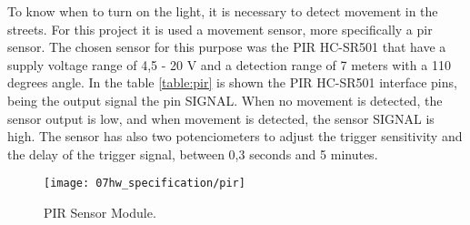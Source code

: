 To know when to turn on the light, it is necessary to detect movement in the streets. For this project it is used a movement sensor, more specifically a \ac{pir} sensor. The chosen sensor for this purpose was the PIR HC-SR501 that have a supply voltage range of 4,5 - 20 V and a detection range of 7 meters with a 110 degrees angle. In the table \ref{table:pir} is shown the PIR HC-SR501 interface pins, being the output signal the pin SIGNAL. When no movement is detected, the sensor output is low, and when movement is detected, the sensor SIGNAL is high. The sensor has also two potenciometers to adjust the trigger sensitivity and the delay of the trigger signal, between 0,3 seconds and 5 minutes.

\begin{figure}[H]
	\centering
	\texttt{[image: 07hw\_specification/pir]}
	\caption{PIR Sensor Module.}
	\label{fig:pir}
\end{figure}

\begin{table}[H]
	\centering
	
	\caption{PIR Module Interface Pins.}
	\label{table:pir}
\end{table}